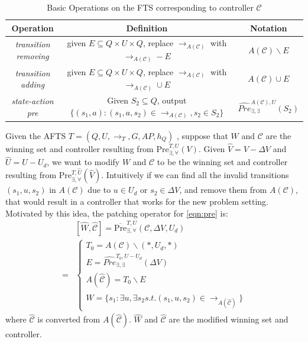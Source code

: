 \begin{table}
	\centering
	\caption{Basic Operations on the FTS corresponding to controller $ \mathcal{C} $}
	\begin{tabular}{ccc}
		\hline
		Operation & Definition & Notation\\
		\hline
		\emph{transition removing} & given $ E\subseteq Q\times U\times Q $, replace $ \rightarrow_{A(\mathcal{C})} $ with $\rightarrow_{A(\mathcal{C})} - E$ & $ A(\mathcal{C})\backslash E $\\
		\emph{transition adding} & given $ E\subseteq Q\times U\times Q $, replace $ \rightarrow_{A(\mathcal{C})} $ with $ \rightarrow_{A(\mathcal{C})}\cup E $ & $ A(\mathcal{C})\cup E $\\
		\emph{state-action pre} &  Given $ S_2\subseteq Q $, output $ \{(s_1,a): (s_1,a,s_2)\in \rightarrow_{A(\mathcal{C})}, s_2\in S_2\} $ & $ \widehat{Pre}^{A(\mathcal{C}),U}_{\exists,\exists}(S_2) $\\
		\hline
	\end{tabular}
	\label{tab:oper}
\end{table}

Given the AFTS $ T = (Q,U,\rightarrow_T, G, AP, h_Q) $ , suppose that  $ W $ and $ \mathcal{C} $ are the winning set and controller resulting from $ \text{Pre}_{\exists,\forall}^{T, U}(V) $. Given $ \widehat{V}= V-\Delta V $ and $ \widehat{U} = U-U_d $, we want to modify $ W $ and $ \mathcal{C} $ to be the winning set and controller resulting from $ \text{Pre}_{\exists,\forall}^{T,\widehat{U}}(\widehat{V}) $. Intuitively if we can find all the invalid transitions $ (s_1,u,s_2) $ in $ A(\mathcal{C}) $ due to $ u\in U_d $ or $ s_2\in\Delta V $, and remove them from $ A(\mathcal{C}) $, that would result in a controller that works for the new problem setting. Motivated by this idea, the patching operator for \eqref{eqn:pre} is:
{\small
\begin{align}
&[\widehat{W},\widehat{\mathcal{C}}]=\overline{\text{Pre}}_{\exists,\forall}^{T, U}(\mathcal{C},\Delta V,U_d)\nonumber\\
=&\begin{cases} 
T_{0} = A(\mathcal{C})\backslash (*,U_d,*)\\
E =  \widehat{Pre}^{T_0,U-U_d}_{\exists,\exists}(\Delta V)\\
A(\widehat{\mathcal{C}}) = T_{0}\backslash E\\
\widehat{W} = \{s_1: \exists u, \exists s_2 s.t. (s_1,u, s_2)\in \rightarrow_{A(\widehat{\mathcal{C}})} \}
\end{cases}\label{patch-pre}
\end{align}}
where $ \widehat{\mathcal{C}} $ is converted from $ A(\widehat{\mathcal{C}}) $. $ \widehat{W} $ and $ \widehat{\mathcal{C}} $ are the modified winning set and controller.


